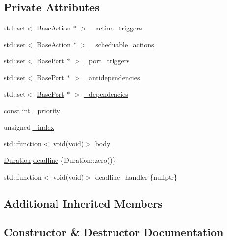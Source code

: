 \subsection*{Private Attributes}
\begin{DoxyCompactItemize}
\item 
std\+::set$<$ \hyperlink{classreactor_1_1BaseAction}{Base\+Action} $\ast$ $>$ \hyperlink{classreactor_1_1Reaction_ae78a33de1d45afcfecf0297d79841028}{\+\_\+action\+\_\+triggers}
\item 
std\+::set$<$ \hyperlink{classreactor_1_1BaseAction}{Base\+Action} $\ast$ $>$ \hyperlink{classreactor_1_1Reaction_af5baa35846e71e7c0fc2f0fc4de14c84}{\+\_\+scheduable\+\_\+actions}
\item 
std\+::set$<$ \hyperlink{classreactor_1_1BasePort}{Base\+Port} $\ast$ $>$ \hyperlink{classreactor_1_1Reaction_a963d6a24063a5dae91f5e74ec9db00bd}{\+\_\+port\+\_\+triggers}
\item 
std\+::set$<$ \hyperlink{classreactor_1_1BasePort}{Base\+Port} $\ast$ $>$ \hyperlink{classreactor_1_1Reaction_aed9f1447027533b2b0c2ae77b933e546}{\+\_\+antidependencies}
\item 
std\+::set$<$ \hyperlink{classreactor_1_1BasePort}{Base\+Port} $\ast$ $>$ \hyperlink{classreactor_1_1Reaction_a5f1411deb1e0d3ab353f4e332a027556}{\+\_\+dependencies}
\item 
const int \hyperlink{classreactor_1_1Reaction_aea5d30c041bc7adb9ab986212bed6af4}{\+\_\+priority}
\item 
unsigned \hyperlink{classreactor_1_1Reaction_a833e6769a31f10fd46399bcaa3b54038}{\+\_\+index}
\item 
std\+::function$<$ void(void)$>$ \hyperlink{classreactor_1_1Reaction_aca4e15066e159bf9c009c87f5ec11180}{body}
\item 
\hyperlink{namespacereactor_aa8375b807a80703545664096c5b5b779}{Duration} \hyperlink{classreactor_1_1Reaction_aa8704882695ff4a0b9ab7d866b2f79b1}{deadline} \{Duration\+::zero()\}
\item 
std\+::function$<$ void(void)$>$ \hyperlink{classreactor_1_1Reaction_aaa6466268aa7e9ba823a7a45b7c75667}{deadline\+\_\+handler} \{nullptr\}
\end{DoxyCompactItemize}
\subsection*{Additional Inherited Members}


\subsection{Constructor \& Destructor Documentation}
\mbox{\label{classreactor_1_1Reaction_a5d6b7249352ddb4c0fdde855fea2b191}} 
